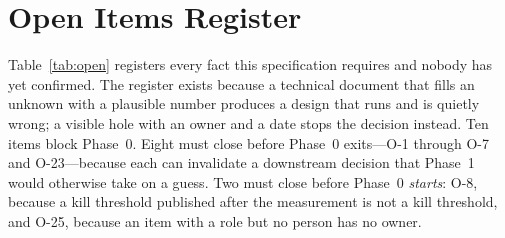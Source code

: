 \section{Open Items Register}\label{sec:open}

Table~\ref{tab:open} registers every fact this specification requires and nobody has yet confirmed. The register exists because a technical document that fills an unknown with a plausible number produces a design that runs and is quietly wrong; a visible hole with an owner and a date stops the decision instead. Ten items block Phase~0. Eight must close before Phase~0 exits---O-1 through O-7 and O-23---because each can invalidate a downstream decision that Phase~1 would otherwise take on a guess. Two must close before Phase~0 \emph{starts}: O-8, because a kill threshold published after the measurement is not a kill threshold, and O-25, because an item with a role but no person has no owner.

